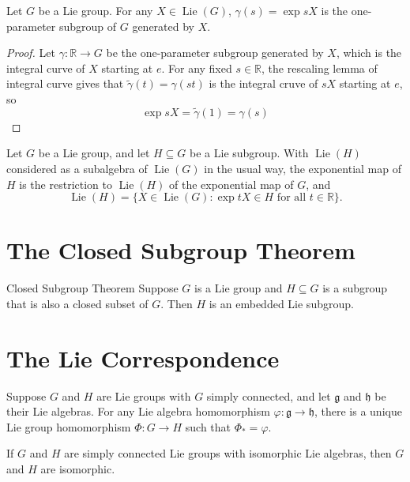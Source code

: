 \documentclass[../main.tex]{subfiles}
\begin{document}
\begin{proposition}{ }{}
Let \(G\) be a Lie group. For any \(X \in \operatorname{Lie}(G)\), \(\gamma(s) = \exp sX\) is the one-parameter subgroup of \(G\) generated by \(X\).
\end{proposition}
\begin{proof}
    Let \(   \gamma :\mathbb{R} \to G  \) be the one-parameter subgroup generated by \(  X  \), which is the integral curve of \(  X  \) starting at \(  e  \). For any fixed \(  s \in \mathbb{R}   \), the rescaling lemma of integral curve gives that \(   \tilde{\gamma} \left( t \right)=  \gamma \left( st \right)    \) is the integral cruve of \(  sX  \) starting at \(  e  \), so \[
    \exp sX=  \tilde{\gamma} \left( 1 \right)=  \gamma \left( s \right)  
    \]        
\end{proof}
\begin{proposition}{}
Let $G$ be a Lie group, and let $H \subseteq G$ be a Lie subgroup. With $\operatorname{Lie}(H)$ considered as a subalgebra of $\operatorname{Lie}(G)$ in the usual way, the exponential map of $H$ is the restriction to $\operatorname{Lie}(H)$ of the exponential map of $G$, and
\[
\operatorname{Lie}(H)=\{X\in\operatorname{Lie}(G):\exp tX\in H\text{ for all }t\in\mathbb{R}\}.
\]
\end{proposition}

\section{The Closed Subgroup Theorem}

\begin{theorem}{Closed Subgroup Theorem}{}
Suppose \(G\) is a Lie group and \(H \subseteq G\) is a subgroup that is also a closed subset of \(G\). Then \(H\) is an embedded Lie subgroup.
\end{theorem}

\section{The Lie Correspondence}
\begin{theorem}{ }{}
Suppose $G$ and $H$ are Lie groups with $G$ simply connected, and let $\mathfrak{g}$ and $\mathfrak{h}$ be their Lie algebras. For any Lie algebra homomorphism $\varphi:\mathfrak{g}\to\mathfrak{h}$, there is a unique Lie group homomorphism $\Phi:G\to H$ such that $\Phi_{*}=\varphi$.
\end{theorem}

\begin{corollary}{}{}
If \(G\) and \(H\) are simply connected Lie groups with isomorphic Lie algebras, then \(G\) and \(H\) are isomorphic.
\end{corollary}
\end{document}
